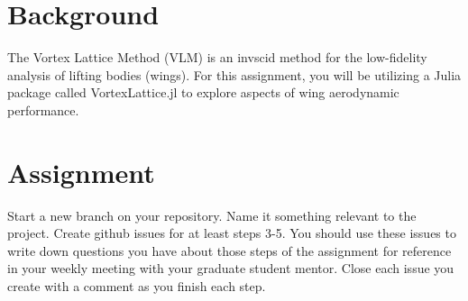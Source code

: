 \documentclass[12pt]{article}
\begin{document}
	

\section{Background}

	The Vortex Lattice Method (VLM) is an invscid method for the low-fidelity analysis of lifting bodies (wings).
	For this assignment, you will be utilizing a Julia package called VortexLattice.jl to explore aspects of wing aerodynamic performance.
	
	
\section{Assignment}
Start a new branch on your repository. Name it something relevant to the project. Create github issues for at least steps 3-5. You should use these issues to write down questions you have about those steps of the assignment for reference in your weekly meeting with your graduate student mentor. Close each issue you create with a comment as you finish each step. 
\end{document}
